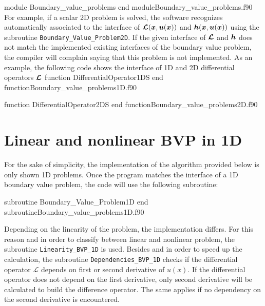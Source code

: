  \vspace{0.2cm} 
       {module Boundary_value_problems}
       {end module}{Boundary_value_problems.f90}
For example, if a scalar 2D problem is solved, the software recognizes automatically associated to the interface  of $  \boldsymbol{\mathcal{L}} (\boldsymbol{x},\boldsymbol{u}(\boldsymbol{x})) $ and $  \boldsymbol{h} (\boldsymbol{x},\boldsymbol{u}(\boldsymbol{x})) $ using the subroutine 
\verb|Boundary_Value_Problem2D|. If the given interface of $ \boldsymbol{\mathcal{L}} $ and $ \boldsymbol{h}$ does not match the implemented existing interfaces of the  boundary value problem, the compiler will complain saying that this problem is not implemented. 
As an example, the following code shows the interface of 1D and 2D differential operators $ \boldsymbol{\mathcal{L}} $
 \vspace{0.2cm} 
       {function DifferentialOperator1DS}
       {end function}{Boundary_value_problems1D.f90}
 
       {function DifferentialOperator2DS}
       {end function}{Boundary_value_problems2D.f90}


 

\newpage
\section{Linear and nonlinear BVP in 1D}
For the sake of simplicity, the implementation of the algorithm provided below   is only shown  1D problems.
Once the program matches the interface of a 1D boundary value problem, the code will use the following subroutine:  
 
       \vspace{0.5cm} 
       {subroutine Boundary_Value_Problem1D}
       {end subroutine}{Boundary_value_problems1D.f90}
 
Depending on the linearity of the problem, the implementation differs. For this reason and in order to classify between linear and nonlinear problem, the subroutine \verb|Linearity_BVP_1D| is used.
Besides and in order to speed up the calculation, the subroutine \verb|Dependencies_BVP_1D| checks if the differential operator
$ \mathcal{L} $ depends on 
first or second derivative of $ u(x) $. If the differential operator does not depend on the first derivative, only second derivative  will be calculated to build the difference operator. The same applies if no dependency on the second derivative is encountered. 


